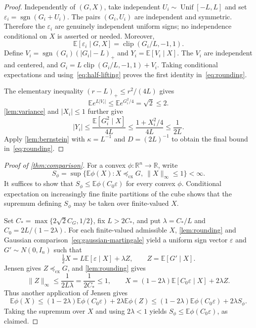 \documentclass[11pt,reqno]{amsart}
\newcommand{\E}{\mathbb E}
\newcommand{\R}{\mathbb R}
\newcommand{\cx}{\preceq_{\mathrm{cx}}}
\begin{document}
\begin{proof}
Independently of $(G,X)$, take independent
$U_i\sim\operatorname{Unif}[-L,L]$ and set
$\varepsilon_i=\operatorname{sgn}(G_i+U_i)$.
The pairs $(G_i,U_i)$ are independent and symmetric. Therefore the
$\varepsilon_i$ are genuinely independent uniform signs; no
independence conditional on $X$ is asserted or needed. Moreover,
\[
 \E[\varepsilon_i\mid G,X]
 =\operatorname{clip}(G_i/L,-1,1).
\]
Define $V_i=\operatorname{sgn}(G_i)(|G_i|-L)_+$ and
$Y_i=\E[V_i\mid X]$.
The $V_i$ are independent and centered, and
$G_i=L\operatorname{clip}(G_i/L,-1,1)+V_i$.
Taking conditional expectations and
using~\eqref{eq:half-lifting} proves the first identity
in~\eqref{eq:rounding}.

The elementary inequality $(r-L)_+\leq r^2/(4L)$ gives
\[
 \E e^{L|V_i|}
 \leq\E e^{G_i^2/4}=\sqrt2\leq2.
\]
\cref{lem:variance} and $|X_i|\leq1$ further give
\[
 |Y_i|
 \leq\frac{\E[G_i^2\mid X]}{4L}
 \leq\frac{1+X_i^2/4}{4L}
 \leq\frac1{2L}.
\]
Apply \cref{lem:bernstein} with
$\kappa=L^{-1}$ and $D=(2L)^{-1}$ to obtain the final
bound in~\eqref{eq:rounding}.
\end{proof}

\begin{proof}[Proof of \cref{thm:comparison}]
For a convex $\phi:\R^n\to\R$, write
\[
 S_\phi=\sup\bigl\{\E\phi(X):X\cx G,\ \|X\|_\infty\leq1\bigr\}<\infty.
\]
It suffices to show that $S_\phi\leq\E\phi(C_0\varepsilon)$ for every
convex $\phi$. Conditional expectation on increasingly fine finite
partitions of the cube shows that the supremum defining $S_\phi$ may be
taken over finite-valued $X$.

Set $C_* =\max\{2\sqrt2C_G,1/2\}$, fix $L>2C_*$, and put
$\lambda=C_*/L$ and $C_0=2L/(1-2\lambda)$. For each finite-valued
admissible $X$, \cref{lem:rounding} and Gaussian
comparison~\eqref{eq:gaussian-martingale} yield a uniform sign vector
$\varepsilon$ and $G'\sim N(0,I_n)$ such that
\[
 \tfrac12X=L\E[\varepsilon\mid X]+\lambda Z,
 \qquad Z=\E[G'\mid X].
\]
Jensen gives $Z\cx G$, and \cref{lem:rounding} gives
\[
 \|Z\|_\infty\leq\frac1{2L\lambda}
 =\frac1{2C_*}\leq1,
 \qquad
 X=(1-2\lambda)\E[C_0\varepsilon\mid X]+2\lambda Z.
\]
Thus another application of Jensen gives
\[
 \E\phi(X)
 \leq(1-2\lambda)\E\phi(C_0\varepsilon)
      +2\lambda\E\phi(Z)
 \leq(1-2\lambda)\E\phi(C_0\varepsilon)+2\lambda S_\phi.
\]
Taking the supremum over $X$ and using $2\lambda<1$ yields
$S_\phi\leq\E\phi(C_0\varepsilon)$, as claimed.
\end{proof}
\end{document}
